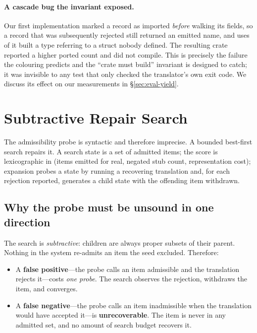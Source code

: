 \documentclass[10pt,twocolumn]{article}
\begin{document}
\paragraph{A cascade bug the invariant exposed.} Our first implementation
marked a record as imported \emph{before} walking its fields, so a record that
was subsequently rejected still returned an emitted name, and uses of it built
a type referring to a struct nobody defined. The resulting crate reported a
higher ported count and did not compile. This is precisely the failure the
colouring predicts and the ``crate must build'' invariant is designed to
catch; it was invisible to any test that only checked the translator's own
exit code. We discuss its effect on our measurements in
\S\ref{sec:eval-yield}.

\section{Subtractive Repair Search}
\label{sec:search}

The admissibility probe is syntactic and therefore imprecise. A bounded
best-first search repairs it. A search state is a set of admitted items; the
score is lexicographic in (items emitted for real, negated stub count,
representation cost); expansion probes a state by running a recovering
translation and, for each rejection reported, generates a child state with the
offending item withdrawn.

\subsection{Why the probe must be unsound in one direction}
\label{sec:directional}

The search is \emph{subtractive}: children are always proper subsets of their
parent. Nothing in the system re-admits an item the seed excluded. Therefore:

\begin{itemize}
\item A \textbf{false positive}---the probe calls an item admissible and the
translation rejects it---costs \emph{one probe}. The search observes the
rejection, withdraws the item, and converges.
\item A \textbf{false negative}---the probe calls an item inadmissible when the
translation would have accepted it---is \textbf{unrecoverable}. The item is
never in any admitted set, and no amount of search budget recovers it.
\end{itemize}
\end{document}
